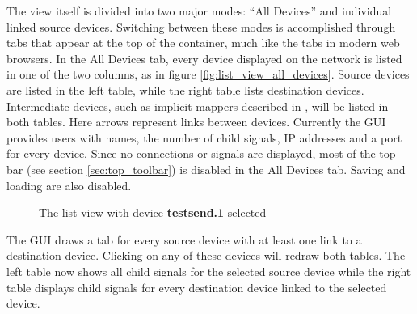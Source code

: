 The view itself is divided into two major modes: ``All Devices'' and individual linked source devices. Switching between these modes is accomplished through tabs that appear at the top of the container, much like the tabs in modern web browsers. In the All Devices tab, every device displayed on the network is listed in one of the two columns, as in figure \ref{fig:list_view_all_devices}. Source devices are listed in the left table, while the right table lists destination devices. Intermediate devices, such as implicit mappers described in \cite{interpolated_mappings}, will be listed in both tables. Here arrows represent links between devices. Currently the GUI provides users with names, the number of child signals, IP addresses and a port for every device. Since no connections or signals are displayed, most of the top bar (see section \ref{sec:top_toolbar}) is disabled in the All Devices tab. Saving and loading are also disabled.

\begin{figure}[ht]
\centering
\caption{The list view with device \textbf{testsend.1} selected}
\label{fig:list_view_single_link}
\end{figure}

The GUI draws a tab for every source device with at least one link to a destination device. Clicking on any of these devices will redraw both tables. The left table now shows all child signals for the selected source device while the right table displays child signals for every destination device linked to the selected device. 

